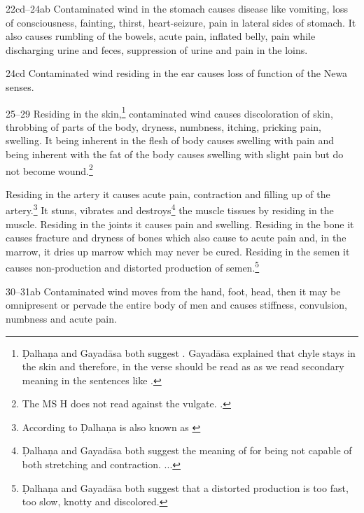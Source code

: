 \begin{translation}
\item[22cd--24ab] Contaminated wind in the stomach causes disease like
vomiting, loss of consciousness, fainting, thirst, heart-seizure, pain in
lateral sides of stomach. It also causes rumbling of the bowels, acute
pain, inflated belly, pain while discharging urine and feces, suppression
of urine and pain in the loins.

\item[24cd]Contaminated wind residing in the ear causes loss of function of 
the Newa
senses.

\item[25--29] Residing in the skin,\footnote{Ḍalhaṇa and Gayadāsa both 
suggest . Gayadāsa explained that chyle stays in the skin and 
therefore, in the verse  should be read as  as we 
read 
secondary meaning in the sentences like .} 
contaminated 
wind causes discoloration of skin, throbbing of parts of the body, dryness, 
numbness, itching, pricking pain, swelling. It being inherent in the flesh of body 
causes swelling with pain and being inherent with the fat of the body causes 
swelling with slight pain but do not become wound.\footnote{The MS H does 
not 
read  against the 
vulgate. 
\citep[261]{vulgate}.}

Residing in the artery it causes acute pain, contraction and filling up of the 
artery.\footnote{According to Ḍalhaṇa  is also known as 
 \citep[262]{vulgate}} It stuns, vibrates and 
destroys\footnote{Ḍalhaṇa and Gayadāsa both suggest the meaning of 
 for being not capable of both stretching and contraction. 
\citep[262]{vulgate} 
...} 
the muscle tissues by residing in the muscle. Residing in the joints it causes 
pain 
and swelling. Residing in the bone it causes fracture and dryness of bones 
which 
also cause to acute pain and, in the marrow, it dries up marrow which may 
never 
be cured. Residing in the semen it causes non-production and distorted 
production of semen.\footnote{Ḍalhaṇa and Gayadāsa both suggest that a 
distorted production  is too fast, too slow, knotty and 
discolored.} 


\item[30--31ab] Contaminated wind moves from the hand, foot, head, then it 
may be omnipresent or pervade the entire body of men and causes stiffness, 
convulsion, numbness and acute pain.


\end{translation}
